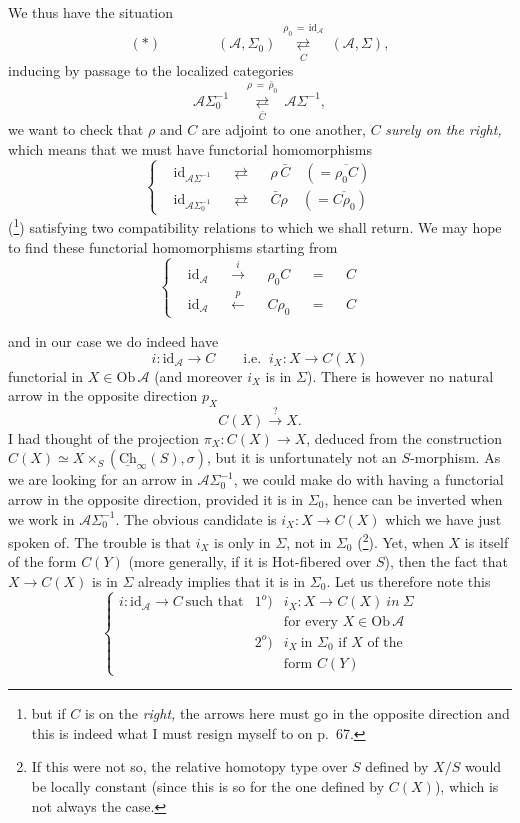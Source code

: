 \documentclass[11pt]{article}
\newcommand{\printedpage}[1]{\marginpar{\footnotesize p.~#1}}
\newcommand{\msp}[1]{\marginpar{\footnotesize [#1]}}
\newcommand{\Ob}{\mathrm{Ob}}
\newcommand{\id}{\mathrm{id}}
\newcommand{\cA}{\mathcal{A}}
\newcommand{\ul}[1]{\underline{\mathrm{#1}}}
\begin{document}
We thus have the situation
\printedpage{40}
\[
(*)\qquad\qquad(\cA,\Sigma_0)\ \underset{C}{\overset{\rho_0\,=\,\id_{\cA}}{\rightleftarrows}}\ (\cA,\Sigma),
\]
inducing by passage to the localized categories
\[
\cA\Sigma_0^{-1}\quad\underset{\bar{C}}{\overset{\rho\,=\,\bar{\rho}_0}{\rightleftarrows}}\ \cA\Sigma^{-1},
\]
we want to check that $\rho$ and $C$ are adjoint to one another, $C$ \textit{surely on the right,} which means that we must have functorial homomorphisms
\[
\left\{
\begin{aligned}
&\id_{\cA\Sigma^{-1}}&&\rightleftarrows&&\rho\,\bar{C}\quad(=\overline{\rho_0C})\\
&\id_{\cA\Sigma_0^{-1}}&&\rightleftarrows&&\bar{C}\rho\quad(=\overline{C\rho_0})
\end{aligned}
\right.
\]
(\footnote[41]{but if $C$ is on the \textit{right,} the arrows here must go in the opposite direction and this is indeed what I must resign myself to on p.~67.}) satisfying two compatibility relations to which we shall return. We may hope to find these functorial homomorphisms starting from
\[
\left\{
\begin{aligned}
&\id_{\cA}&&\xrightarrow{\ i\ }&&\rho_0C&&=&&C\\
&\id_{\cA}&&\xleftarrow{\ p\ }&&C\rho_0&&=&&C
\end{aligned}
\right.
\]

\msp{page 66}
and in our case we do indeed have
\[
i:\id_{\cA}\longrightarrow C\qquad\text{i.e. }\ i_X:X\longrightarrow C(X)
\]
functorial in $X\in\Ob\,\cA$ (and moreover $i_X$ is in $\Sigma$). There is however no natural arrow in the opposite direction $p_X$
\[
C(X)\xrightarrow{\ ?\ }X.
\]
I had thought of the projection $\pi_X:C(X)\longrightarrow X$, deduced from the construction $C(X)\simeq X\times_S(\ul{Ch}_\infty(S),\sigma)$, but it is unfortunately not an $S$-morphism. As we are looking for an arrow in $\cA\Sigma_0^{-1}$, we could make do with having a functorial arrow in the opposite direction, provided it is in $\Sigma_0$, hence can be inverted when we work in $\cA\Sigma_0^{-1}$. The obvious candidate is $i_X:X\longrightarrow C(X)$ which we have just spoken of. The trouble is that $i_X$ is only in $\Sigma$, not in $\Sigma_0$ (\footnote[42]{If this were not so, the relative homotopy type over $S$ defined by $X/S$ would be locally constant (since this is so for the one defined by $C(X)$), which is not always the case.}). Yet, when $X$ is itself of the form $C(Y)$ (more generally, if it is Hot-fibered over $S$), then the fact that $X\longrightarrow C(X)$ is in $\Sigma$ already implies that it is in $\Sigma_0$. Let us therefore note this %
\[
\left\{
\begin{array}{lrl}
i:\id_{\cA}\longrightarrow C\ \text{such that} & 1^o) & i_X:X\longrightarrow C(X)\ \textit{in}\ \Sigma\\[1ex]
 & & \text{for every }X\in\Ob\,\cA\\[1ex]
 & 2^o) & i_X\ \text{in }\Sigma_0\text{ if }X\text{ of the}\\[1ex]
 & & \text{form }C(Y)
\end{array}
\right.
\]
\end{document}
